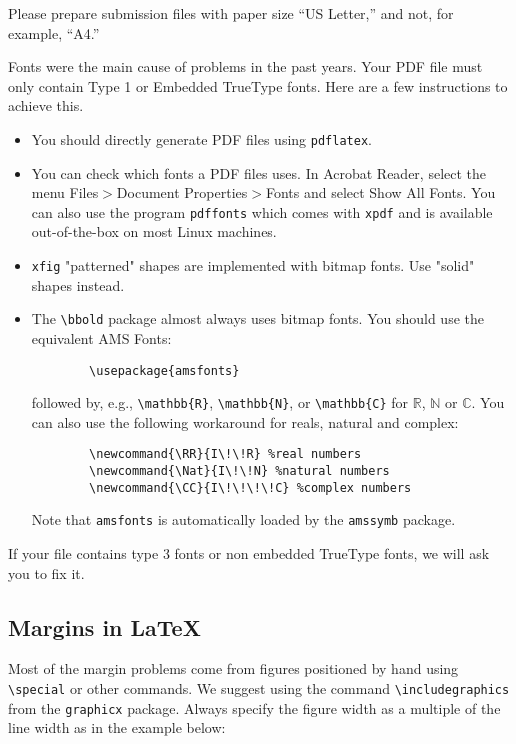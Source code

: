 \documentclass{article}
\begin{document}
Please prepare submission files with paper size ``US Letter,'' and not, for example, ``A4.''

Fonts were the main cause of problems in the past years. Your PDF file must only contain Type 1 or Embedded TrueType fonts. Here are a few instructions to achieve this.

\begin{itemize}
    \item You should directly generate PDF files using \verb+pdflatex+.
    \item You can check which fonts a PDF files uses. In Acrobat Reader, select the menu Files$>$Document Properties$>$Fonts and select Show All Fonts. You can also use the program \verb+pdffonts+ which comes with \verb+xpdf+ and is available out-of-the-box on most Linux machines.
    \item \verb+xfig+ "patterned" shapes are implemented with bitmap fonts. Use "solid" shapes instead.
    \item The \verb+\bbold+ package almost always uses bitmap fonts. You should use the equivalent AMS Fonts:
    \begin{verbatim}
        \usepackage{amsfonts}
    \end{verbatim}
        followed by, e.g., \verb+\mathbb{R}+, \verb+\mathbb{N}+, or \verb+\mathbb{C}+ for $\mathbb{R}$, $\mathbb{N}$ or $\mathbb{C}$. You can also use the following workaround for reals, natural and complex:
    \begin{verbatim}
        \newcommand{\RR}{I\!\!R} %real numbers
        \newcommand{\Nat}{I\!\!N} %natural numbers
        \newcommand{\CC}{I\!\!\!\!C} %complex numbers
    \end{verbatim}
        Note that \verb+amsfonts+ is automatically loaded by the \verb+amssymb+ package.
\end{itemize}

If your file contains type 3 fonts or non embedded TrueType fonts, we will ask you to fix it.

\subsection{Margins in \LaTeX{}}

Most of the margin problems come from figures positioned by hand using \verb+\special+ or other commands. We suggest using the command \verb+\includegraphics+ from the \verb+graphicx+ package. Always specify the figure width as a multiple of the line width as in the example below:
\end{document}
